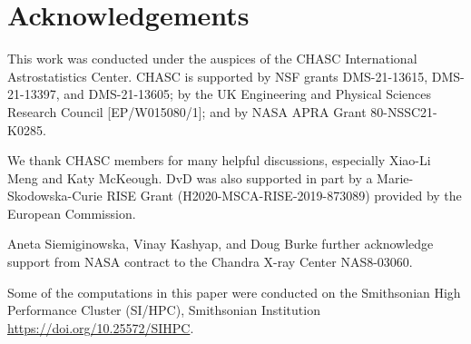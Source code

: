 \documentclass[twocolumn]{aastex631}
\begin{document}
    \section*{Acknowledgements}
    This work was conducted under the auspices of the CHASC International Astrostatistics Center.
    CHASC is supported by NSF grants DMS-21-13615, DMS-21-13397, and DMS-21-13605; by the UK Engineering
    and Physical Sciences Research Council [EP/W015080/1]; and by NASA APRA Grant 80-NSSC21-K0285.
    
    We thank CHASC members for many helpful discussions, especially Xiao-Li Meng and Katy McKeough.
    DvD was also supported in part by a Marie-Skodowska-Curie RISE Grant (H2020-MSCA-RISE-2019-873089)
    provided by the European Commission.
    
    Aneta Siemiginowska, Vinay Kashyap, and Doug Burke further acknowledge support from NASA
    contract to the Chandra X-ray Center NAS8-03060.

    Some of the computations in this paper were conducted on the Smithsonian High Performance
    Cluster (SI/HPC), Smithsonian Institution \url{https://doi.org/10.25572/SIHPC}.

    \newpage
    
\end{document}
